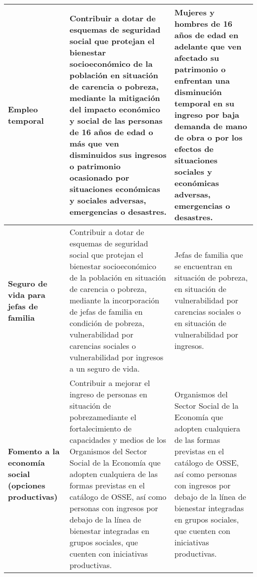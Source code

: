 \begin{longtable}{|p{4cm}|p{6cm}|p{6cm}|}
    \hline
    \textbf{Empleo temporal} & Contribuir   a   dotar   de   esquemas   de seguridad social     que     protejan el bienestar socioeconómico de la población   en  situación  de   carencia   o pobreza,   mediante   la   mitigación   del impacto   económico   y   social   de   las personas de 16 años de edad o más que ven disminuidos sus ingresos o patrimonio  ocasionado  por situaciones económicas y sociales adversas, emergencias o desastres. & Mujeres y hombres de 16 años de edad en   adelante   que   ven   afectado   su patrimonio o enfrentan una disminución  temporal  en  su  ingreso por baja demanda de mano de obra o por los efectos de situaciones sociales y económicas adversas, emergencias o desastres. \\
    \hline
    \textbf{Seguro de vida para jefas de familia} & Contribuir   a   dotar   de   esquemas   de seguridad     social     que     protejan el bienestar socioeconómico de la población   en  situación  de   carencia   o pobreza,  mediante  la  incorporación  de jefas de familia en condición de pobreza, vulnerabilidad  por  carencias  sociales  o vulnerabilidad por ingresos a un seguro de vida. & Jefas  de  familia  que  se  encuentran  en situación  de  pobreza,  en  situación  de vulnerabilidad  por  carencias  sociales o  en  situación  de  vulnerabilidad  por ingresos. \\
    \hline
    \textbf{Fomento a la economía social (opciones productivas)} & Contribuir   a   mejorar el ingreso de personas en situación de pobrezamediante el fortalecimiento de capacidades y medios de los Organismos del Sector Social de la Economía que adopten cualquiera de las formas previstas en el catálogo de OSSE, así como personas con ingresos por debajo de la  línea de bienestar integradas en grupos     sociales,     que     cuenten     con iniciativas productivas. & Organismos   del   Sector   Social   de   la Economía  que  adopten  cualquiera  de las formas previstas en el catálogo de OSSE, así como personas con ingresos por debajo de la línea de bienestar integradas en grupos sociales, que cuenten con iniciativas productivas. \\
    \hline
\end{longtable}

